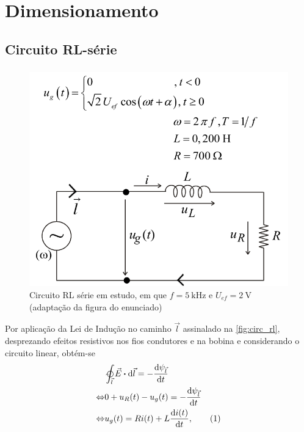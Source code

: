 \documentclass[a4paper, titlepage, portuguese]{article}
\newcommand{\eq}{\Leftrightarrow} %
\newcommand\numberthis{\addtocounter{equation}{1}\tag{\theequation}}
\begin{document}

	\section{Dimensionamento}
	\subsection{Circuito RL-série}
	\subsubsection{}
		\begin{figure}[H]
			\centering
			\includegraphics[width=0.55\linewidth]{rl.png}
			\caption{Circuito RL série em estudo, em que $f = \SI{5}{\kilo\hertz}$ e $U_{ef} = \SI{2}{\volt}$ (adaptação da figura do enunciado)}
			\label{fig:circ_rl}
		\end{figure}
		\par
		Por aplicação da Lei de Indução no caminho $\vec{l}$ assinalado na \autoref{fig:circ_rl}, desprezando efeitos resistivos nos fios condutores e na bobina e considerando o circuito linear, obtém-se
		\begin{align*}
			&\ointclockwise_{\vec{l}} \vec{E} \vdot \dd{\vec{l}} = - \dv{\psi_{\vec{l}}}{t} \\ \eq
			&0 + u_R(t) - u_g(t) = - \dv{\psi_{\vec{l}}}{t} \\ \eq
			&u_g(t) = Ri(t) + L \dv{i(t)}{t}, \numberthis \label{eq:trans_RL}
		\end{align*}
		
\end{document}
